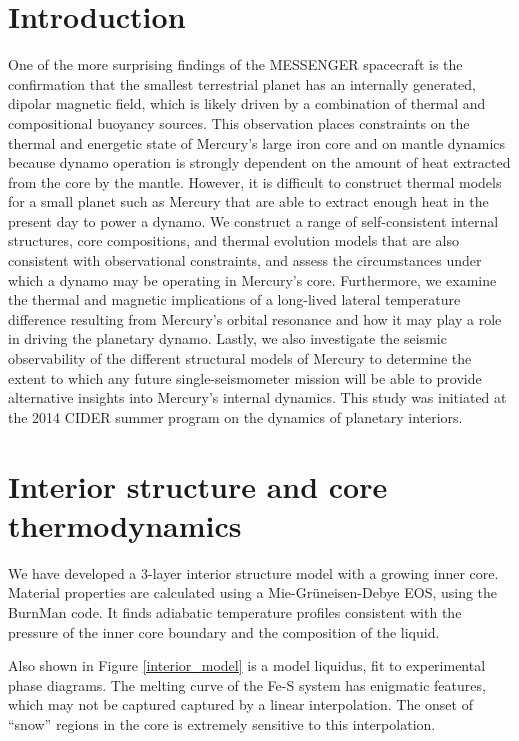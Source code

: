 \documentclass[landscape,a0b,final]{a0poster}
\begin{document}
\begin{multicols}{3}

\section*{Introduction}

One of the more surprising findings of the MESSENGER spacecraft is the confirmation that the smallest terrestrial planet has an internally generated, dipolar magnetic field, which is likely driven by a combination of thermal and compositional buoyancy sources. 
This observation places constraints on the thermal and energetic state of Mercury's large iron core and on mantle dynamics because dynamo operation is strongly dependent on the amount of heat extracted from the core by the mantle.
However, it is difficult to construct thermal models for a small planet such as Mercury that are able to extract enough heat in the present day to power a dynamo. 
We construct a range of self-consistent internal structures, core compositions, and thermal evolution models that are also consistent with observational constraints, and assess the circumstances under which a dynamo may be operating in Mercury's core. 
Furthermore, we examine the thermal and magnetic implications of a long-lived lateral temperature difference resulting from Mercury's orbital resonance and how it may play a role in driving the planetary dynamo. 
Lastly, we also investigate the seismic observability of the different structural models of Mercury to determine the extent to which any future single-seismometer mission will be able to provide alternative insights into Mercury's internal dynamics.
This study was initiated at the 2014 CIDER summer program on the dynamics of planetary interiors.


\section*{Interior structure and core thermodynamics}

We have developed a 3-layer interior structure model with a growing inner core.
Material properties are calculated using a Mie-Gr\"{u}neisen-Debye EOS, using the BurnMan
code. It finds adiabatic temperature profiles consistent with the pressure of the 
inner core boundary and the composition of the liquid. 

Also shown in Figure \ref{interior_model} is a model liquidus, fit to experimental
phase diagrams. The melting curve of the Fe-S system has enigmatic features, which
may not be captured captured by a  linear interpolation. The onset of ``snow''
regions in the core is extremely sensitive to this interpolation.


\end{multicols}
\end{document}
